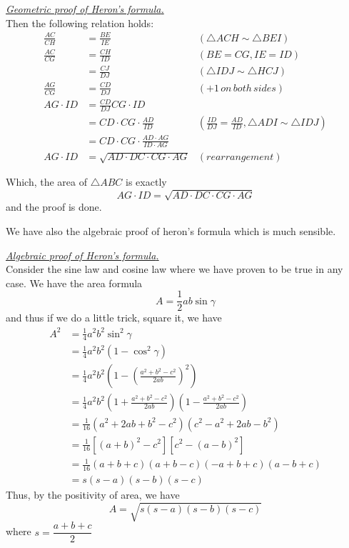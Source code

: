 \documentclass[12pt]{article}
\renewenvironment{proof}[1][Proof]{\begin{snugshade*} \underline{\textit{{#1}.}}\\}{\hfill \qedsymbol \end{snugshade*}}
\begin{document}
\begin{proof}[Geometric proof of Heron's formula]
        Then the following relation holds:\begin{align*}
            \frac{AC}{CH}&=\frac{BE}{IE}&(\triangle ACH \sim \triangle BEI)\\
            \frac{AC}{CG}&=\frac{CH}{ID}&(BE=CG,IE=ID)\\
            &=\frac{CJ}{DJ}&(\triangle IDJ \sim \triangle HCJ)\\
            \frac{AG}{CG}&=\frac{CD}{DJ}&(+1\, on\, both\, sides)\\
            AG\cdot ID&=\frac{CD}{DJ}CG\cdot ID\\
            &=CD\cdot CG\cdot \frac{AD}{ID}&(\frac{ID}{DJ}=\frac{AD}{ID},\triangle ADI\sim\triangle IDJ)\\
            &=CD\cdot CG\cdot \frac{AD\cdot AG}{ID\cdot AG}\\
            AG\cdot ID&=\sqrt{AD\cdot DC\cdot CG\cdot AG}&(rearrangement)
        \end{align*}

        Which, the area of $\triangle ABC$ is exactly $$AG\cdot ID=\sqrt{AD\cdot DC\cdot CG\cdot AG}$$ and the proof is done.
    \end{proof}

    We have also the algebraic proof of heron's formula which is much sensible.

    \begin{proof}[Algebraic proof of Heron's formula]
        Consider the sine law and cosine law where we have proven to be true in any case. We have the area formula $$A=\frac{1}{2}ab\sin{\gamma}$$ and thus if we do a little trick, square it, we have \begin{align*}
            A^2&=\frac{1}{4}a^2b^2\sin^2{\gamma}\\
            &=\frac{1}{4}a^2b^2(1-\cos^2{\gamma})\\
            &=\frac{1}{4}a^2b^2(1-(\frac{a^2+b^2-c^2}{2ab})^2)\\
            &=\frac{1}{4}a^2b^2(1+\frac{a^2+b^2-c^2}{2ab})(1-\frac{a^2+b^2-c^2}{2ab})\\
            &=\frac{1}{16}(a^2+2ab+b^2-c^2)(c^2-a^2+2ab-b^2)\\
            &=\frac{1}{16}[(a+b)^2-c^2][c^2-(a-b)^2]\\
            &=\frac{1}{16}(a+b+c)(a+b-c)(-a+b+c)(a-b+c)\\
            &=s(s-a)(s-b)(s-c)
        \end{align*}
        Thus, by the positivity of area, we have $$A=\sqrt{s(s-a)(s-b)(s-c)}$$ where $s=\dfrac{a+b+c}{2}$
    \end{proof}
\end{document}
